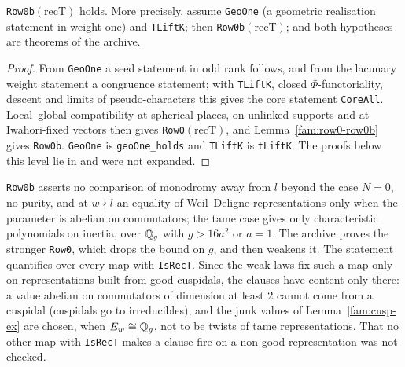 \begin{theorem}\label{fam:gal-strong}
\texttt{Row0b}$(\mathrm{recT})$ holds. More precisely, assume \texttt{GeoOne} (a geometric realisation statement in weight one) and \texttt{TLiftK}; then \texttt{Row0b}$(\mathrm{recT})$; and both hypotheses are theorems of the archive.
\end{theorem}
\begin{proof}
From \texttt{GeoOne} a seed statement in odd rank follows, and from the lacunary weight statement a congruence statement; with \texttt{TLiftK}, closed $\Phi$-functoriality, descent and limits of pseudo-characters this gives the core statement \texttt{CoreAll}. Local--global compatibility at spherical places, on unlinked supports and at Iwahori-fixed vectors then gives \texttt{Row0}$(\mathrm{recT})$, and Lemma~\ref{fam:row0-row0b} gives \texttt{Row0b}. \texttt{GeoOne} is \texttt{geoOne\_holds} and \texttt{TLiftK} is \texttt{tLiftK}. The proofs below this level lie in  and were not expanded.
\end{proof}

\begin{remark}\label{fam:rem-row-strength}
\texttt{Row0b} asserts no comparison of monodromy away from $l$ beyond the case $N=0$, no purity, and at $w\nmid l$ an equality of Weil--Deligne representations only when the parameter is abelian on commutators; the tame case gives only characteristic polynomials on inertia, over $\mathbb{Q}_g$ with $g>16a^2$ or $a=1$. The archive proves the stronger \texttt{Row0}, which drops the bound on $g$, and then weakens it. The statement quantifies over every map with \texttt{IsRecT}. Since the weak laws fix such a map only on representations built from good cuspidals, the clauses have content only there: a value abelian on commutators of dimension at least $2$ cannot come from a cuspidal (cuspidals go to irreducibles), and the junk values of Lemma~\ref{fam:cusp-ex} are chosen, when $E_w\cong\mathbb{Q}_g$, not to be twists of tame representations. That no other map with \texttt{IsRecT} makes a clause fire on a non-good representation was not checked.
\end{remark}


